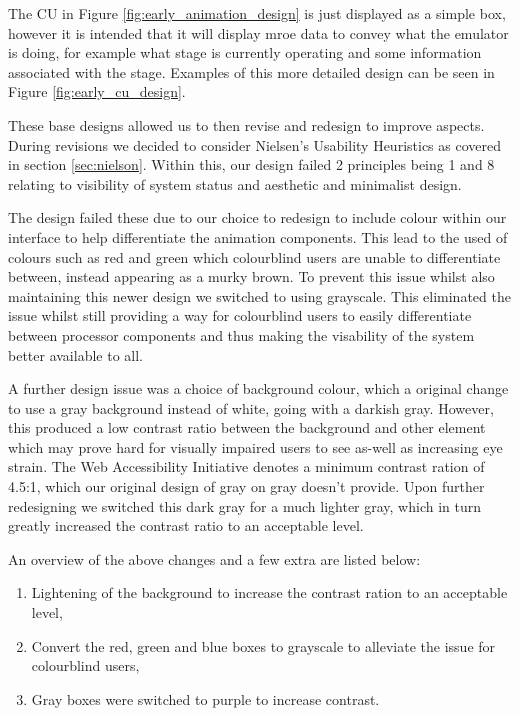 The \ac{CU} in Figure \ref{fig:early_animation_design} is just displayed as a simple box, however it is intended that it will display mroe data to convey what the emulator is doing, for example what stage is currently operating and some information associated with the stage. Examples of this more detailed design can be seen in Figure \ref{fig:early_cu_design}.

These base designs allowed us to then revise and redesign to improve aspects. During revisions we decided to consider Nielsen's Usability Heuristics \cite{nielsen_2020_10} as covered in section \ref{sec:nielson}. Within this, our design failed 2 principles being 1 and 8 relating to visibility of system  status and aesthetic and minimalist design.

The design failed these due to our choice to redesign to include colour within our interface to help differentiate the animation components. This lead to the used of colours such as red and green which colourblind users are unable to differentiate between, instead appearing as a murky brown. To prevent this issue whilst also maintaining this newer design we switched to using grayscale. This eliminated the issue whilst still providing a way for colourblind users to easily differentiate between processor components and thus making the visability of the system better available to all.

A further design issue was a choice of background colour, which a original change to use a gray background instead of white, going with a darkish gray. However, this produced a low contrast ratio between the background and other element which may prove hard for visually impaired users to see as-well as increasing eye strain. The Web Accessibility Initiative \cite{webaccessibilityinitiativew3_2022_understanding} denotes a minimum contrast ration of 4.5:1, which our original design of gray on gray doesn't provide. Upon further redesigning we switched this dark gray for a much lighter gray, which in turn greatly increased the contrast ratio to an acceptable level.

An overview of the above changes and a few extra are listed below:
\begin{enumerate}
    \item Lightening of the background to increase the contrast ration to an acceptable level,
    \item Convert the red, green and blue boxes to grayscale to alleviate the issue for colourblind users,
    \item Gray boxes were switched to purple to increase contrast.
\end{enumerate}

